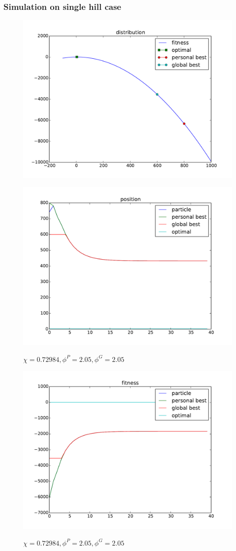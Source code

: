 \subsubsection{Simulation on single hill case}

\begin{figure}[ht]
\centering
\includegraphics[width=.7\linewidth]{./simfig/case1/distribution1}
\label{fig:case1-1:distribution} 
\end{figure}

\begin{figure}[ht]
\centering
\includegraphics[width=.7\linewidth]{./simfig/case1/position1-1} 
\label{fig:case1-1:position}
\caption{$ \chi = 0.72984 , \phi^{P} = 2.05 , \phi^{G} = 2.05 $ }
\end{figure}

\begin{figure}[ht]
\centering
\includegraphics[width=.7\linewidth]{./simfig/case1/fitness1-1} 
\label{fig:case1-1:fitness}
\caption{$ \chi = 0.72984 , \phi^{P} = 2.05 , \phi^{G} = 2.05 $ }
\end{figure}

